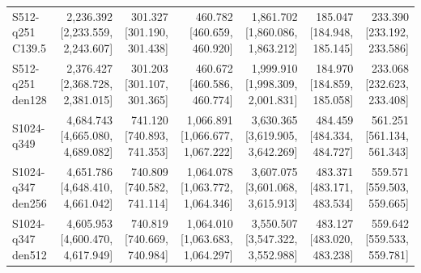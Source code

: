 \begin{table}[t]
{\begin{tabular}{lrrrrrr}
S512-q251 C139.5 & \shortstack{2,236.392\\{}[2,233.559, 2,243.607]} & \shortstack{301.327\\{}[301.190, 301.438]} & \shortstack{460.782\\{}[460.659, 460.920]} & \shortstack{1,861.702\\{}[1,860.086, 1,863.212]} & \shortstack{185.047\\{}[184.948, 185.145]} & \shortstack{233.390\\{}[233.192, 233.586]} \\
S512-q251 den128 & \shortstack{2,376.427\\{}[2,368.728, 2,381.015]} & \shortstack{301.203\\{}[301.107, 301.365]} & \shortstack{460.672\\{}[460.586, 460.774]} & \shortstack{1,999.910\\{}[1,998.309, 2,001.831]} & \shortstack{184.970\\{}[184.859, 185.058]} & \shortstack{233.068\\{}[232.623, 233.408]} \\
S1024-q349 & \shortstack{4,684.743\\{}[4,665.080, 4,689.082]} & \shortstack{741.120\\{}[740.893, 741.353]} & \shortstack{1,066.891\\{}[1,066.677, 1,067.222]} & \shortstack{3,630.365\\{}[3,619.905, 3,642.269]} & \shortstack{484.459\\{}[484.334, 484.727]} & \shortstack{561.251\\{}[561.134, 561.343]} \\
S1024-q347 den256 & \shortstack{4,651.786\\{}[4,648.410, 4,661.042]} & \shortstack{740.809\\{}[740.582, 741.114]} & \shortstack{1,064.078\\{}[1,063.772, 1,064.346]} & \shortstack{3,607.075\\{}[3,601.068, 3,615.913]} & \shortstack{483.371\\{}[483.171, 483.534]} & \shortstack{559.571\\{}[559.503, 559.665]} \\
S1024-q347 den512 & \shortstack{4,605.953\\{}[4,600.470, 4,617.949]} & \shortstack{740.819\\{}[740.669, 740.984]} & \shortstack{1,064.010\\{}[1,063.683, 1,064.297]} & \shortstack{3,550.507\\{}[3,547.322, 3,552.988]} & \shortstack{483.127\\{}[483.020, 483.238]} & \shortstack{559.642\\{}[559.533, 559.781]} \\

\end{tabular}}
\end{table}
